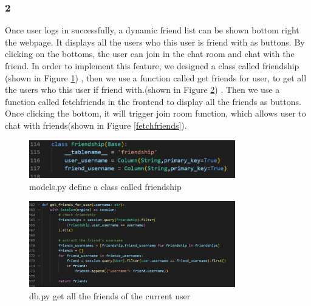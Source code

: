 \documentclass[12pt]{article}
\begin{document}
        \subsubsection*{2} Once user logs in successfully, a dynamic friend list can be shown bottom right the webpage. It displays all the users who this user is friend with as buttons. By clicking on the bottoms, the user can join in the chat room and chat with the friend. In order to implement this feature, we designed a class called friendship (shown in Figure \ref{friendshipClass}) , then we use a function called get friends for user, to get all the users who this user if friend with.(shown in Figure \ref{getfriends}) . Then we use a function called fetchfriends in the frontend to display all the friends as buttons. Once clicking the bottom, it will trigger join room function, which allows user to chat with friends(shown in Figure \ref{fetchfriends}).

        \begin{figure}[H]
            \centering
            \includegraphics[width=0.8\textwidth]{zzrgraphs/models_friendship.png}
            \caption{models.py define a class called friendship}
            \label{friendshipClass}
        \end{figure}

        \begin{figure}[H]
                \centering
                \includegraphics[width=0.8\textwidth]{zzrgraphs/db_getfriendforuser.png}
                \caption{db.py get all the friends of the current user}
                \label{getfriends}
            \end{figure}
\end{document}
